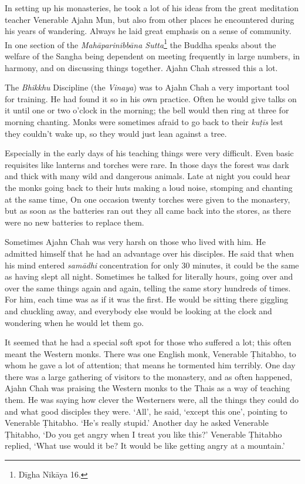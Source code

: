In setting up his monasteries, he took a lot of his ideas from the great
meditation teacher Venerable Ajahn Mun, but also from other places he
encountered during his years of wandering. Always he laid great emphasis
on a sense of community. In one section of the \emph{Mahāparinibbāna
Sutta}\footnote{Dīgha Nikāya 16.} the Buddha speaks
about the welfare of the Sangha being dependent on meeting frequently in
large numbers, in harmony, and on discussing things together. Ajahn Chah
stressed this a lot. 

The \emph{Bhikkhu} Discipline (the \emph{Vinaya}) was to Ajahn Chah a
very important tool for training. He had found it so in his own
practice. Often he would give talks on it until one or two o'clock in
the morning; the bell would then ring at three for morning chanting. 
Monks were sometimes afraid to go back to their \emph{kuṭīs} lest they
couldn't wake up, so they would just lean against a tree. 

Especially in the early days of his teaching things were very difficult. 
Even basic requisites like lanterns and torches were rare. In those days
the forest was dark and thick with many wild and dangerous animals. Late
at night you could hear the monks going back to their huts making a loud
noise, stomping and chanting at the same time, On one occasion twenty
torches were given to the monastery, but as soon as the batteries ran
out they all came back into the stores, as there were no new batteries
to replace them. 

Sometimes Ajahn Chah was very harsh on those who lived with him. He
admitted himself that he had an advantage over his disciples. He said
that when his mind entered \emph{samādhi} concentration for only 30
minutes, it could be the same as having slept all night. Sometimes he
talked for literally hours, going over and over the same things again
and again, telling the same story hundreds of times. For him, each time
was as if it was the first. He would be sitting there giggling and
chuckling away, and everybody else would be looking at the clock and
wondering when he would let them go. 

It seemed that he had a special soft spot for those who suffered a lot; 
this often meant the Western monks. There was one English monk, 
Venerable Ṭhitabho, to whom he gave a lot of attention; that means he
tormented him terribly. One day there was a large gathering of visitors
to the monastery, and as often happened, Ajahn Chah was praising the
Western monks to the Thais as a way of teaching them. He was saying how
clever the Westerners were, all the things they could do and what good
disciples they were. `All', he said, `except this one', pointing to
Venerable Ṭhitabho. `He's really stupid.' Another day he asked Venerable
Ṭhitabho, `Do you get angry when I treat you like this?' Venerable
Ṭhitabho replied, `What use would it be? It would be like getting angry
at a mountain.'

